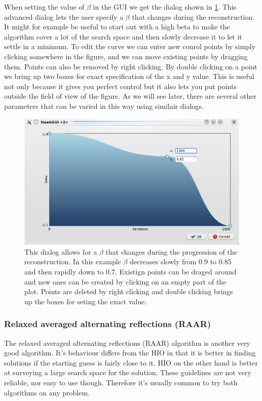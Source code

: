 \documentclass[11pt,a4paper]{article}
\begin{document}
When setting the value of $\beta$ in the GUI we get the dialog shown in \ref{fig:beta}. This advanced dialog lets the user specify a $\beta$ that changes during the reconstruction. It might for example be useful to start out with a high beta to make the algorithm cover a lot of the search space and then slowly decrease it to let it settle in a minimum. To edit the curve we can enter new conrol points by simply clicking somewhere in the figure, and we can move existing points by dragging them. Points can also be removed by right clicking. By double clicking on a point we bring up two boxes for exact specification of the x and y value. This is useful not only because it gives you perfect control but it also lets you put points outside the field of view of the figure. As we will see later, there are several other parameters that can be varied in this way using similair dialogs.
\begin{figure}
  \includegraphics[width=\textwidth]{Images/GUI/beta.png}
  \caption{This dialog allows for a $\beta$ that changes during the progression of the reconstruction. In this example $\beta$ decreases slowly from $0.9$ to $0.85$ and then rapidly down to $0.7$. Existign points can be draged around and new ones can be created by clicking on an empty part of the plot. Points are deleted by right clicking and double clicking brings up the boxes for seting the exact value.}
  \label{fig:beta}
\end{figure}

\subsubsection{Relaxed averaged alternating reflections (RAAR)}
The relaxed averaged alternating reflections (RAAR) algorithm is another very good algorithm. It's behaviour differs from the HIO in that it is better in finding solutions if the starting guess is fairly close to it. HIO on the other hand is better at surveying a large search space for the solution. These guidelines are not very reliable, nor easy to use though. Therefore it's usually common to try both algorithms on any problem.
\end{document}
